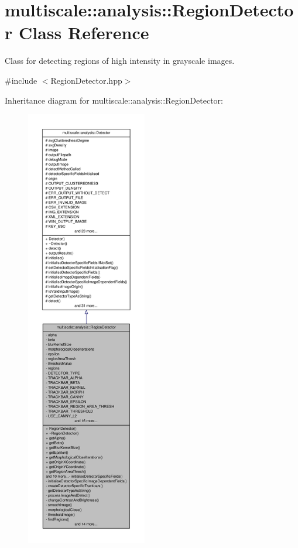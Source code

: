 \hypertarget{classmultiscale_1_1analysis_1_1RegionDetector}{\section{multiscale\-:\-:analysis\-:\-:\-Region\-Detector \-Class \-Reference}
\label{classmultiscale_1_1analysis_1_1RegionDetector}
}


\-Class for detecting regions of high intensity in grayscale images.  




{\ttfamily \#include $<$\-Region\-Detector.\-hpp$>$}



\-Inheritance diagram for multiscale\-:\-:analysis\-:\-:\-Region\-Detector\-:
\nopagebreak
\begin{figure}[H]
\begin{center}
\leavevmode
\includegraphics[height=550pt]{classmultiscale_1_1analysis_1_1RegionDetector__inherit__graph}
\end{center}
\end{figure}


